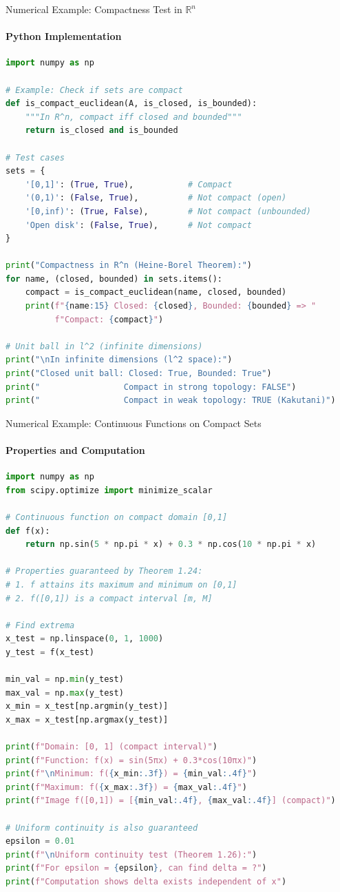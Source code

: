 \documentclass[aspectratio=169,10pt]{beamer}
\theoremstyle{definition}
\begin{document}
\begin{frame}[fragile]{Numerical Example: Compactness Test in $\mathbb{R}^n$}
\framesubtitle{Python Implementation}

\begin{lstlisting}[language=Python]
import numpy as np

# Example: Check if sets are compact
def is_compact_euclidean(A, is_closed, is_bounded):
    """In R^n, compact iff closed and bounded"""
    return is_closed and is_bounded

# Test cases
sets = {
    '[0,1]': (True, True),           # Compact
    '(0,1)': (False, True),          # Not compact (open)
    '[0,inf)': (True, False),        # Not compact (unbounded)
    'Open disk': (False, True),      # Not compact
}

print("Compactness in R^n (Heine-Borel Theorem):")
for name, (closed, bounded) in sets.items():
    compact = is_compact_euclidean(name, closed, bounded)
    print(f"{name:15} Closed: {closed}, Bounded: {bounded} => "
          f"Compact: {compact}")

# Unit ball in l^2 (infinite dimensions)
print("\nIn infinite dimensions (l^2 space):")
print("Closed unit ball: Closed: True, Bounded: True")
print("                 Compact in strong topology: FALSE")
print("                 Compact in weak topology: TRUE (Kakutani)")
\end{lstlisting}
\end{frame}

\begin{frame}[fragile]{Numerical Example: Continuous Functions on Compact Sets}
\framesubtitle{Properties and Computation}

\begin{lstlisting}[language=Python]
import numpy as np
from scipy.optimize import minimize_scalar

# Continuous function on compact domain [0,1]
def f(x):
    return np.sin(5 * np.pi * x) + 0.3 * np.cos(10 * np.pi * x)

# Properties guaranteed by Theorem 1.24:
# 1. f attains its maximum and minimum on [0,1]
# 2. f([0,1]) is a compact interval [m, M]

# Find extrema
x_test = np.linspace(0, 1, 1000)
y_test = f(x_test)

min_val = np.min(y_test)
max_val = np.max(y_test)
x_min = x_test[np.argmin(y_test)]
x_max = x_test[np.argmax(y_test)]

print(f"Domain: [0, 1] (compact interval)")
print(f"Function: f(x) = sin(5πx) + 0.3*cos(10πx)")
print(f"\nMinimum: f({x_min:.3f}) = {min_val:.4f}")
print(f"Maximum: f({x_max:.3f}) = {max_val:.4f}")
print(f"Image f([0,1]) = [{min_val:.4f}, {max_val:.4f}] (compact)")

# Uniform continuity is also guaranteed
epsilon = 0.01
print(f"\nUniform continuity test (Theorem 1.26):")
print(f"For epsilon = {epsilon}, can find delta = ?")
print(f"Computation shows delta exists independent of x")
\end{lstlisting}
\end{frame}
\end{document}
